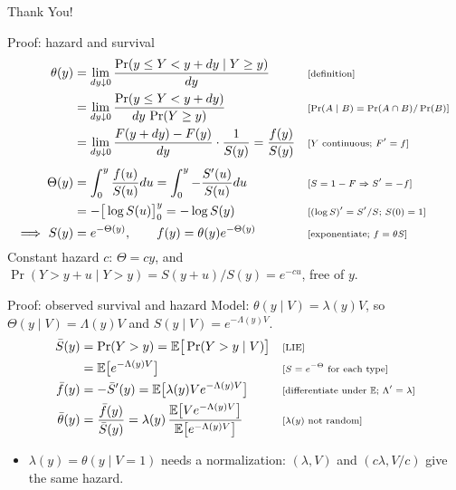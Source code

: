 \documentclass[aspectratio=169,10pt]{beamer}
\newcommand{\E}{\mathbb{E}}
\newcommand{\why}[1]{\text{\scriptsize[#1]}}
\begin{document}
\begin{frame}
  \centering\Huge Thank You!
\end{frame}

\appendix
{}
\newcommand{\back}[1]{\vfill\hfill\hyperlink{#1}{\beamerreturnbutton{Back}}}

\begin{frame}[label=p-hazard]{Proof: hazard and survival}
  \begin{align*}
    \theta(y) &= \lim_{dy\downarrow0}\frac{\Pr(y\le Y<y+dy\mid Y\ge y)}{dy} && \why{definition} \\
    &= \lim_{dy\downarrow0}\frac{\Pr(y\le Y<y+dy)}{dy\,\Pr(Y\ge y)} && \why{$\Pr(A\mid B)=\Pr(A\cap B)/\Pr(B)$} \\
    &= \lim_{dy\downarrow0}\frac{F(y+dy)-F(y)}{dy}\cdot\frac{1}{S(y)} = \frac{f(y)}{S(y)} && \why{$Y$ continuous; $F'=f$} \\[4pt]
    \Theta(y) &= \int_0^y\frac{f(u)}{S(u)}du = \int_0^y -\frac{S'(u)}{S(u)}du && \why{$S=1-F\Rightarrow S'=-f$} \\
    &= -\big[\log S(u)\big]_0^y = -\log S(y) && \why{$(\log S)'=S'/S$; $S(0)=1$} \\
    \Longrightarrow\ S(y) &= e^{-\Theta(y)}, \qquad f(y)=\theta(y)e^{-\Theta(y)} && \why{exponentiate; $f=\theta S$}
  \end{align*}
  Constant hazard $c$: $\Theta=cy$, and $\Pr(Y>y+u\mid Y>y)=S(y+u)/S(y)=e^{-cu}$, free of $y$.
  \back{m-hazard}
\end{frame}

\begin{frame}[label=p-pop]{Proof: observed survival and hazard}
  Model: $\theta(y\mid V)=\lambda(y)V$, so $\Theta(y\mid V)=\Lambda(y)V$ and $S(y\mid V)=e^{-\Lambda(y)V}$.
  \begin{align*}
    \bar S(y) &= \Pr(Y>y) = \E\big[\Pr(Y>y\mid V)\big] && \why{LIE} \\
    &= \E\big[e^{-\Lambda(y)V}\big] && \why{$S=e^{-\Theta}$ for each type} \\
    \bar f(y) &= -\bar S'(y) = \E\big[\lambda(y)Ve^{-\Lambda(y)V}\big] && \why{differentiate under $\E$; $\Lambda'=\lambda$} \\
    \bar\theta(y) &= \frac{\bar f(y)}{\bar S(y)} = \lambda(y)\,\frac{\E\big[Ve^{-\Lambda(y)V}\big]}{\E\big[e^{-\Lambda(y)V}\big]} && \why{$\lambda(y)$ not random}
  \end{align*}
  \begin{itemize}
    \item $\lambda(y)=\theta(y\mid V=1)$ needs a normalization: $(\lambda,V)$ and $(c\lambda,V/c)$ give the same hazard.
  \end{itemize}
  \back{m-pop}
\end{frame}
\end{document}
